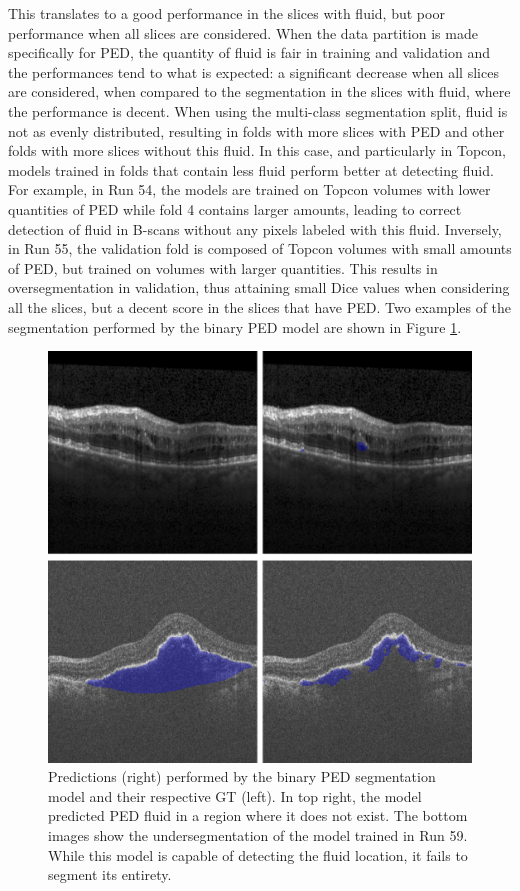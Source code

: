 This translates to a good performance in the slices with fluid, but poor performance when all slices are considered. When the data partition is made specifically for PED, the quantity of fluid is fair in training and validation and the performances tend to what is expected: a significant decrease when all slices are considered, when compared to the segmentation in the slices with fluid, where the performance is decent. When using the multi-class segmentation split, fluid is not as evenly distributed, resulting in folds with more slices with PED and other folds with more slices without this fluid. In this case, and particularly in Topcon, models trained in folds that contain less fluid perform better at detecting fluid. For example, in Run 54, the models are trained on Topcon volumes with lower quantities of PED while fold 4 contains larger amounts, leading to correct detection of fluid in B-scans without any pixels labeled with this fluid. Inversely, in Run 55, the validation fold is composed of Topcon volumes with small amounts of PED, but trained on volumes with larger quantities. This results in oversegmentation in validation, thus attaining small Dice values when considering all the slices, but a decent score in the slices that have PED. Two examples of the segmentation performed by the binary PED model are shown in Figure \ref{fig:Experiment2PEDSegmentation}.

\begin{figure}[!ht]
	\centering
	\includegraphics[width=0.7\linewidth]{figures/Experiment2PEDSegmentation.png}
	\caption{Predictions (right) performed by the binary PED segmentation model and their respective GT (left). In top right, the model predicted PED fluid in a region where it does not exist. The bottom images show the undersegmentation of the model trained in Run 59. While this model is capable of detecting the fluid location, it fails to segment its entirety.}
	\label{fig:Experiment2PEDSegmentation}
\end{figure}


